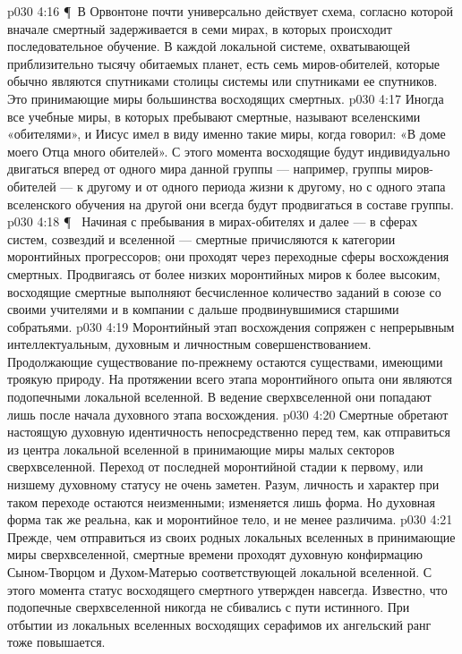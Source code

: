 \vs p030 4:16 \P\ В Орвонтоне почти универсально действует схема, согласно которой вначале смертный задерживается в семи мирах, в которых происходит последовательное обучение. В каждой локальной системе, охватывающей приблизительно тысячу обитаемых планет, есть семь миров\hyp{}обителей, которые обычно являются спутниками столицы системы или спутниками ее спутников. Это принимающие миры большинства восходящих смертных.
\vs p030 4:17 Иногда все учебные миры, в которых пребывают смертные, называют вселенскими «обителями», и Иисус имел в виду именно такие миры, когда говорил: «В доме моего Отца много обителей». С этого момента восходящие будут индивидуально двигаться вперед от одного мира данной группы --- например, группы миров\hyp{}обителей --- к другому и от одного периода жизни к другому, но с одного этапа вселенского обучения на другой они всегда будут продвигаться в составе группы.
\vs p030 4:18 \P\ \bibnobreakspace {} Начиная с пребывания в мирах\hyp{}обителях и далее --- в сферах систем, созвездий и вселенной --- смертные причисляются к категории моронтийных прогрессоров; они проходят через переходные сферы восхождения смертных. Продвигаясь от более низких моронтийных миров к более высоким, восходящие смертные выполняют бесчисленное количество заданий в союзе со своими учителями и в компании с дальше продвинувшимися старшими собратьями.
\vs p030 4:19 Моронтийный этап восхождения сопряжен с непрерывным интеллектуальным, духовным и личностным совершенствованием. Продолжающие существование по\hyp{}прежнему остаются существами, имеющими троякую природу. На протяжении всего этапа моронтийного опыта они являются подопечными локальной вселенной. В ведение сверхвселенной они попадают лишь после начала духовного этапа восхождения.
\vs p030 4:20 Смертные обретают настоящую духовную идентичность непосредственно перед тем, как отправиться из центра локальной вселенной в принимающие миры малых секторов сверхвселенной. Переход от последней моронтийной стадии к первому, или низшему духовному статусу не очень заметен. Разум, личность и характер при таком переходе остаются неизменными; изменяется лишь форма. Но духовная форма так же реальна, как и моронтийное тело, и не менее различима.
\vs p030 4:21 Прежде, чем отправиться из своих родных локальных вселенных в принимающие миры сверхвселенной, смертные времени проходят духовную конфирмацию Сыном\hyp{}Творцом и Духом\hyp{}Матерью соответствующей локальной вселенной. С этого момента статус восходящего смертного утвержден навсегда. Известно, что подопечные сверхвселенной никогда не сбивались с пути истинного. При отбытии из локальных вселенных восходящих серафимов их ангельский ранг тоже повышается.
